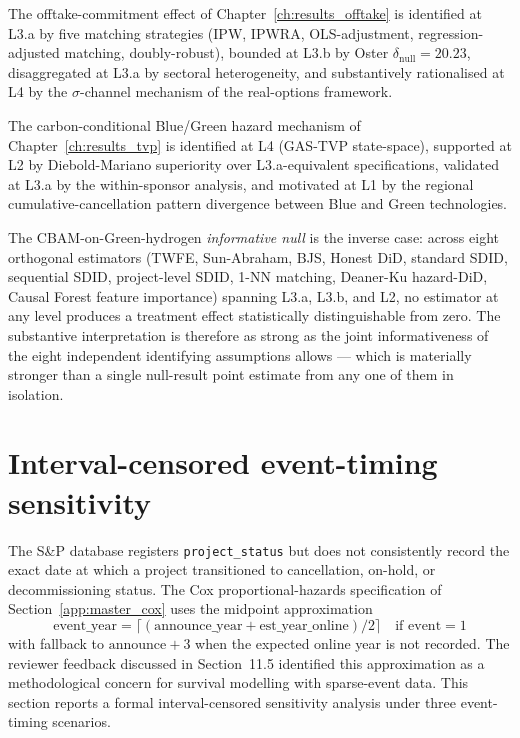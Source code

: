 The offtake-commitment effect of Chapter~\ref{ch:results_offtake} is identified at L3.a by five matching strategies (IPW, IPWRA, OLS-adjustment, regression-adjusted matching, doubly-robust), bounded at L3.b by Oster $\delta_{\text{null}} = 20.23$, disaggregated at L3.a by sectoral heterogeneity, and substantively rationalised at L4 by the $\sigma$-channel mechanism of the real-options framework.

The carbon-conditional Blue/Green hazard mechanism of Chapter~\ref{ch:results_tvp} is identified at L4 (GAS-TVP state-space), supported at L2 by Diebold-Mariano superiority over L3.a-equivalent specifications, validated at L3.a by the within-sponsor analysis, and motivated at L1 by the regional cumulative-cancellation pattern divergence between Blue and Green technologies.

The CBAM-on-Green-hydrogen \emph{informative null} is the inverse case: across eight orthogonal estimators (TWFE, Sun-Abraham, BJS, Honest DiD, standard SDID, sequential SDID, project-level SDID, 1-NN matching, Deaner-Ku hazard-DiD, Causal Forest feature importance) spanning L3.a, L3.b, and L2, no estimator at any level produces a treatment effect statistically distinguishable from zero. The substantive interpretation is therefore as strong as the joint informativeness of the eight independent identifying assumptions allows --- which is materially stronger than a single null-result point estimate from any one of them in isolation.


\section{Interval-censored event-timing sensitivity}
\label{app:interval_censored}

The S\&P database registers \texttt{project\_status} but does not consistently record the exact date at which a project transitioned to cancellation, on-hold, or decommissioning status. The Cox proportional-hazards specification of Section~\ref{app:master_cox} uses the midpoint approximation
\[
\text{event\_year} = \lceil(\text{announce\_year} + \text{est\_year\_online})/2\rceil \quad \text{if event}=1
\]
with fallback to $\text{announce} + 3$ when the expected online year is not recorded. The reviewer feedback discussed in Section~11.5 identified this approximation as a methodological concern for survival modelling with sparse-event data. This section reports a formal interval-censored sensitivity analysis under three event-timing scenarios.

